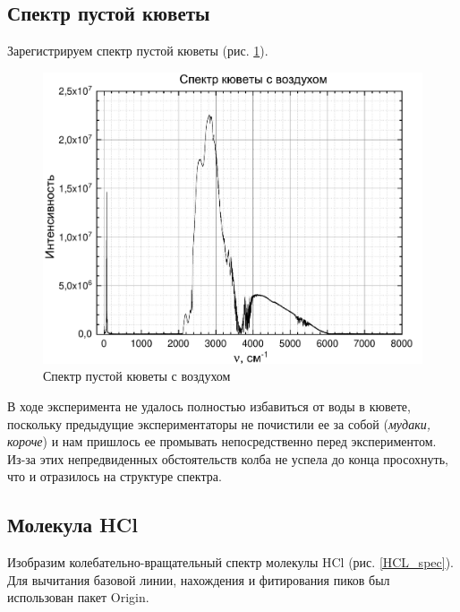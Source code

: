 \subsection{Спектр пустой кюветы}
Зарегистрируем спектр пустой кюветы (рис. \ref{fig:empty_kvartz}).

\begin{figure}[H]
	\centering
	\vspace{-1.5cm}
	\includegraphics[angle = 90, height=0.85\textheight]{data/vozdyh_kvartz}
	\caption{Спектр пустой кюветы с воздухом}
	\label{fig:empty_kvartz}
\end{figure}

В ходе эксперимента не удалось полностью избавиться от воды в кювете, поскольку предыдущие экспериментаторы не почистили ее за собой (\textit{мудаки, короче}) и нам пришлось ее промывать непосредственно перед экспериментом. Из-за этих непредвиденных обстоятельств колба не успела до конца просохнуть, что и отразилось на структуре спектра.

\subsection{Молекула HCl}
Изобразим колебательно-вращательный спектр молекулы HCl (рис. \ref{HCL_spec}). Для вычитания базовой линии, нахождения и фитирования пиков был использован пакет Origin.


